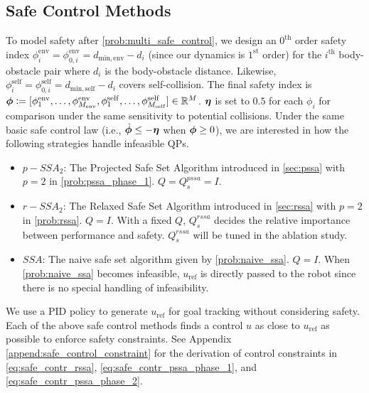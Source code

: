 \subsection{Safe Control Methods}

To model safety after \eqref{prob:multi_safe_control}, we design an $0^\mathrm{th}$ order safety index $\phi^\mathrm{env}_i=\phi^\mathrm{env}_{0,i}=d_\mathrm{min,env}-d_i$ (since our dynamics is $1^\mathrm{st}$ order) for the $i^\mathrm{th}$ body-obstacle pair where $d_i$ is the body-obstacle distance.
Likewise, $\phi^\mathrm{self}_i = \phi^\mathrm{self}_{0,i} = d_\mathrm{min,self}-d_i$  covers self-collision.
The final safety index is $\bm{\phi}\vcentcolon=[\phi^\mathrm{env}_1,\dots,\phi^\mathrm{env}_{M_\mathrm{env}},\phi^\mathrm{self}_1,\dots,\phi^\mathrm{self}_{M_\mathrm{self}}]\in\mathbb{R}^M$.
$\bm{\eta}$ is set to $0.5$ for each $\phi_i$ for comparison under the same sensitivity to potential collisions.
Under the same basic safe control law (i.e., $\dot{\bm{\phi}}\leq -\bm{\eta}$ when $\bm{\phi} \geq 0$), we are interested in how the following strategies handle infeasible QPs.

\begin{itemize}
\item \textbf{$p-SSA_2$}: The Projected Safe Set Algorithm introduced in \cref{sec:pssa} with $p=2$ in \eqref{prob:pssa_phase_1}. $Q=Q^{pssa}_s=I$.

\item \textbf{$r-SSA_2$}: The Relaxed Safe Set Algorithm introduced in \cref{sec:rssa} with $p=2$ in \eqref{prob:rssa}. $Q=I$. With a fixed $Q$, $Q^{rssa}_s$ decides the relative importance between performance and safety. $Q^{rssa}_s$ will be tuned in the ablation study.

\item \textbf{$SSA$}: The naive safe set algorithm given by \eqref{prob:naive_ssa}. $Q=I$. When \eqref{prob:naive_ssa} becomes infeasible, $u_\mathrm{ref}$ is directly passed to the robot since there is no special handling of infeasibility.
\end{itemize}

We use a PID policy to generate $u_\mathrm{ref}$ for goal tracking without considering safety.
Each of the above safe control methods finds a control $u$ as close to $u_\mathrm{ref}$ as possible to enforce safety constraints.
See Appendix \ref{append:safe_control_constraint} for the derivation of control constraints in \eqref{eq:safe_contr_rssa}, \eqref{eq:safe_contr_pssa_phase_1}, and \eqref{eq:safe_contr_pssa_phase_2}.


